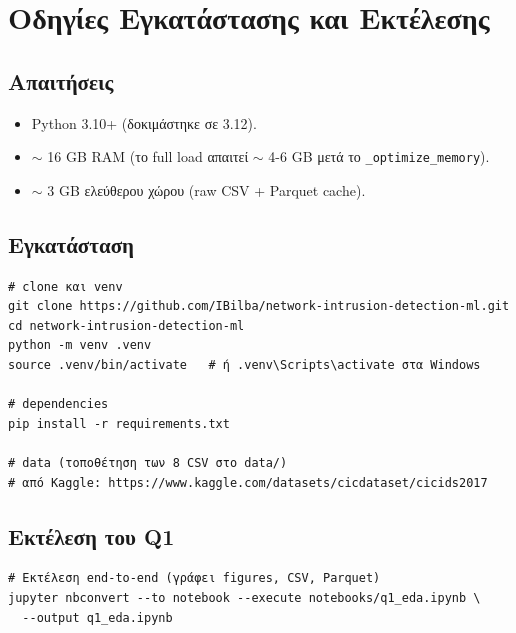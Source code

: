 \documentclass[12pt,a4paper,twoside]{book}
\begin{document}
\appendix

\chapter{Οδηγίες Εγκατάστασης και Εκτέλεσης}

\section{Απαιτήσεις}

\begin{itemize}
    \item Python 3.10+ (δοκιμάστηκε σε 3.12).
    \item \(\sim\) 16 GB RAM (το full load απαιτεί \(\sim\) 4-6 GB
    μετά το \texttt{\_optimize\_memory}).
    \item \(\sim\) 3 GB ελεύθερου χώρου (raw CSV + Parquet cache).
\end{itemize}

\section{Εγκατάσταση}

\begin{tcolorbox}[myCustomStyle={Εγκατάσταση}]
\begin{lstlisting}[style=myBashStyle]
# clone και venv
git clone https://github.com/IBilba/network-intrusion-detection-ml.git
cd network-intrusion-detection-ml
python -m venv .venv
source .venv/bin/activate   # ή .venv\Scripts\activate στα Windows

# dependencies
pip install -r requirements.txt

# data (τοποθέτηση των 8 CSV στο data/)
# από Kaggle: https://www.kaggle.com/datasets/cicdataset/cicids2017
\end{lstlisting}
\end{tcolorbox}

\section{Εκτέλεση του Q1}

\begin{tcolorbox}[myCustomStyle={Run}]
\begin{lstlisting}[style=myBashStyle]
# Εκτέλεση end-to-end (γράφει figures, CSV, Parquet)
jupyter nbconvert --to notebook --execute notebooks/q1_eda.ipynb \
  --output q1_eda.ipynb
\end{lstlisting}
\end{tcolorbox}
\end{document}
